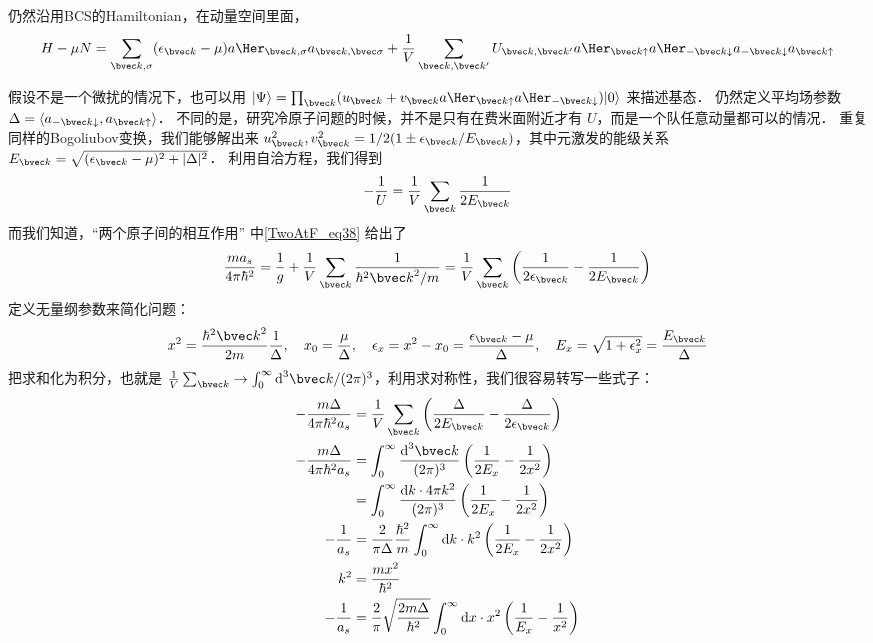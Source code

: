 
仍然沿用BCS的Hamiltonian，在动量空间里面，
\begin{equation}
H-\mu N = \sum_{{\bvec k},\sigma}(\epsilon_{\bvec k}-\mu)a\Her_{{\bvec k},\sigma}a_{\bvec k, \bvec \sigma}+\frac{1}{V}\sum_{\bvec k,  \bvec k'}U_{\bvec k, \bvec k'}a\Her_{\bvec k\uparrow}a\Her_{-\bvec k\downarrow}a_{-\bvec k\downarrow}a_{\bvec k\uparrow}
\end{equation}

假设不是一个微扰的情况下，也可以用 $|\Psi\rangle = \prod_{\bvec k}(u_{\bvec k}+v_{\bvec k}a\Her_{\bvec k\uparrow}a\Her_{-\bvec k\downarrow})|0\rangle$ 来描述基态． 仍然定义平均场参数 $\Delta = \langle a_{-\bvec k\downarrow},a_{\bvec k\uparrow}\rangle$． 不同的是，研究冷原子问题的时候，并不是只有在费米面附近才有 $U$，而是一个队任意动量都可以的情况． 重复同样的Bogoliubov变换，我们能够解出来 $u_{\bvec k}^2, v_{\bvec k}^2 = 1/2(1\pm\epsilon_{\bvec k}/E_{\bvec k})$，其中元激发的能级关系$E_{\bvec k}=\sqrt{(\epsilon_{\bvec k}-\mu)^2+|\Delta|^2}$． 利用自洽方程，我们得到
\begin{equation}
-\frac{1}{U} = \frac{1}{V}\sum_{\bvec k}\frac{1}{2E_{\bvec k}}
\end{equation}
而我们知道，“两个原子间的相互作用” 中\autoref{TwoAtF_eq38} 给出了
\begin{equation}
\frac{ma_s}{4\pi\hbar^2} = \frac{1}{g} + \frac{1}{V}\sum_{\bvec k}\frac{1}{\hbar^2{\bvec k}^2/m} = \frac{1}{V}\sum_{\bvec k}\left(\frac{1}{2\epsilon_{\bvec k}} - \frac{1}{2E_{\bvec k}}\right)
\end{equation}
定义无量纲参数来简化问题：
\begin{equation}
x^2 = \frac{\hbar^2{\bvec k}^2}{2m}\frac{1}{\Delta},\quad x_0 = \frac{\mu}{\Delta},\quad \epsilon_x = x^2-x_0 = \frac{\epsilon_{\bvec k}-\mu}{\Delta},\quad E_x = \sqrt{1+\epsilon_x^2} = \frac{E_{\bvec k}}{\Delta}
\end{equation}
把求和化为积分，也就是 $\frac{1}{V}\sum_{\bvec k}\to\int_0^\infty \text{d}^3{\bvec k}/(2\pi)^3$，利用求对称性，我们很容易转写一些式子：
\begin{equation}
\begin{split}
-\frac{m\Delta}{4\pi\hbar^2 a_s} &=\frac{1}{V}\sum_{\bvec k}\left(\frac{\Delta}{2E_{\bvec k}} - \frac{\Delta}{2\epsilon_{\bvec k}}\right)\\
-\frac{m\Delta}{4\pi\hbar^2 a_s} &=\int_0^\infty\frac{\text{d}^3{\bvec k}}{(2\pi)^3}\left(\frac{1}{2E_x} - \frac{1}{2x^2}\right) \\
&=\int_0^\infty\frac{\text{d}k\cdot 4\pi k^2}{(2\pi)^3}\left(\frac{1}{2E_x} - \frac{1}{2x^2}\right)\\
-\frac{1}{a_s} &= \frac{2}{\pi\Delta}\frac{\hbar^2}{m}\int_0^\infty\text{d}k\cdot k^2\left(\frac{1}{2E_x} - \frac{1}{2x^2}\right)\\
k^2 &= \frac{mx^2}{\hbar^2}\\
-\frac{1}{a_s} &= \frac{2}{\pi}\sqrt{\frac{2m\Delta}{\hbar^2}}\int_0^\infty \text{d}x\cdot x^2\left(\frac{1}{E_x}-\frac{1}{x^2}\right)
\end{split}
\end{equation}

